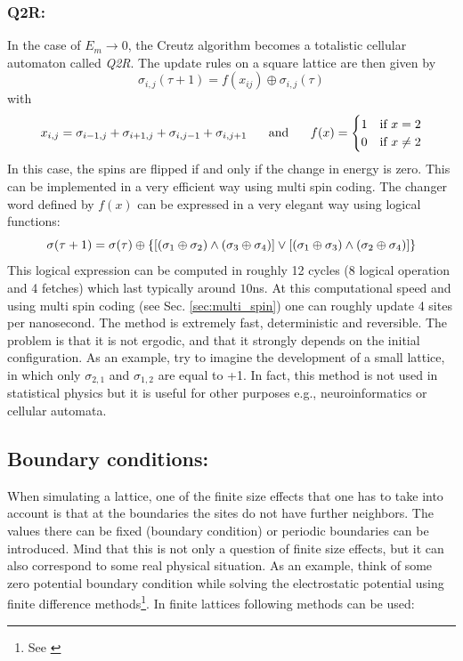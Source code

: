 \subsubsection*{Q2R:}
In the case of $E_m\rightarrow0$, the Creutz algorithm becomes a totalistic cellular automaton called \emph{Q2R}. The update rules on a square lattice are then given by
 $$
 \sigma_{i,j}(\tau+1) = f(x_{ij})\oplus\sigma_{i,j}(\tau)
 $$
with 
$$
x_{i,j}= \sigma_{i-1,j} +\sigma_{i+1,j} +\sigma_{i,j-1} +\sigma_{i,j+1}
\text{\hspace{0.5cm} and  \hspace{0.5cm}}\hfill 
f(x)=\begin{cases}
  1  & \text{if }x=2\\
  0 & \text{if }x\neq 2
\end{cases}
$$
In this case, the spins are flipped if and only if the change in energy is zero. This can be implemented in a very efficient way using multi spin coding. The changer word defined by $f(x)$ can be expressed in a very elegant way using logical functions:
$$
\sigma(\tau+1) = \sigma(\tau)\oplus\left\{ \left[\left(\sigma_1\oplus \sigma_2\right)  \wedge  \left(\sigma_3\oplus \sigma_4\right) \right]  \lor   \left[\left(\sigma_1\oplus \sigma_3\right)  \wedge  \left(\sigma_2\oplus \sigma_4\right) \right] \right\}
$$
This logical expression can be computed in roughly 12 cycles (8 logical operation and 4 fetches) which last typically around $10$ns. At this computational speed and using multi spin coding (see Sec. \ref{sec:multi_spin}) one can roughly update 4 sites per nanosecond. The method is extremely fast, deterministic and reversible. The problem is that it is not ergodic, and that it strongly depends on the initial configuration. As an example, try to imagine the development of a small lattice, in which only $\sigma_{2,1}$ and $\sigma_{1,2}$ are equal to +1. In fact, this method is not used in statistical physics but it is useful for other purposes e.g., neuroinformatics or cellular automata.




 \subsection{Boundary conditions:}
 
When simulating a lattice, one of the finite size effects that one has to take into account is that at the boundaries the sites do not have further neighbors. The values there can be fixed (boundary condition) or periodic boundaries can be introduced. Mind that this is not only a question of finite size effects, but it can also correspond to some real physical situation. As an example, think of some zero potential boundary condition while solving the electrostatic potential using finite difference methods\footnote{See \citet{comp_phys}}. In finite lattices following methods can be used:

